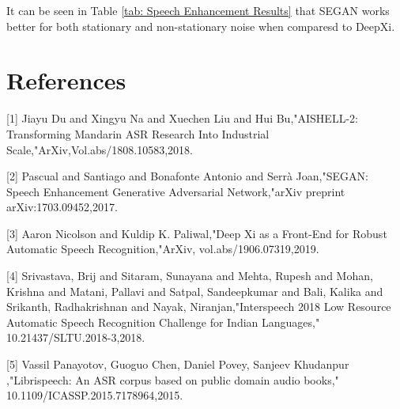 \documentclass[12pt]{article}
\begin{document}
It can be seen in Table \ref{tab: Speech Enhancement Results}  that SEGAN works better for both stationary and non-stationary noise when comparesd to DeepXi.

%


%
\newpage
\section{References}

[1] Jiayu Du and Xingyu Na and Xuechen Liu and Hui Bu,"AISHELL-2: Transforming Mandarin      	ASR Research Into Industrial Scale,"ArXiv,Vol.abs/1808.10583,2018.

[2] Pascual and Santiago and Bonafonte Antonio and Serr{\`a} Joan,"SEGAN: Speech 				Enhancement Generative Adversarial Network,"arXiv preprint arXiv:1703.09452,2017.

[3] Aaron Nicolson and Kuldip K. Paliwal,"Deep Xi as a Front-End for Robust Automatic 			Speech Recognition,"ArXiv, vol.abs/1906.07319,2019.

[4] Srivastava, Brij and Sitaram, Sunayana and Mehta, Rupesh and Mohan, Krishna and 			Matani, Pallavi and Satpal, Sandeepkumar and Bali, Kalika and Srikanth, 					Radhakrishnan and Nayak, Niranjan,"Interspeech 2018 Low Resource Automatic Speech 			Recognition Challenge for Indian Languages," 10.21437/SLTU.2018-3,2018.

[5] Vassil Panayotov, Guoguo Chen, Daniel Povey, Sanjeev Khudanpur ,"Librispeech: An ASR 	corpus based on public domain audio books,"  10.1109/ICASSP.2015.7178964,2015.



\vspace{-100mm}
\end{document}
